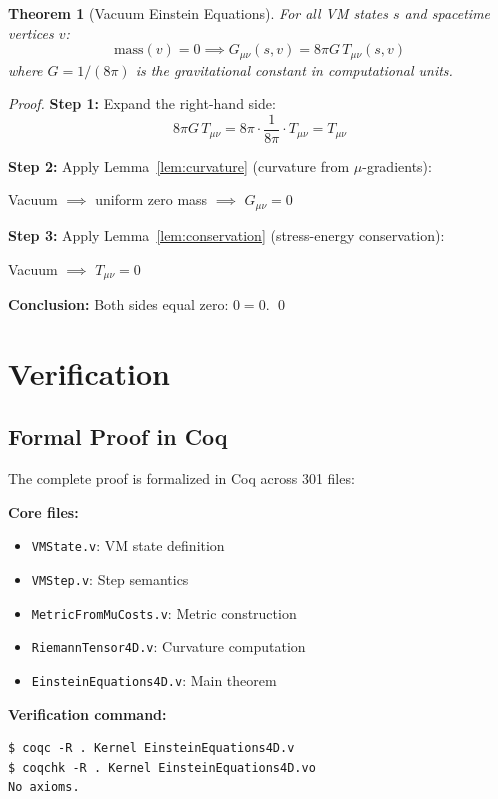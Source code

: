 \documentclass[11pt,twocolumn]{article}
\newtheorem{theorem}{Theorem}
\begin{document}
\begin{theorem}[Vacuum Einstein Equations]
For all VM states $s$ and spacetime vertices $v$:
\begin{equation}
\text{mass}(v) = 0 \implies G_{\mu\nu}(s,v) = 8\pi G \, T_{\mu\nu}(s,v)
\end{equation}
where $G = 1/(8\pi)$ is the gravitational constant in computational units.
\end{theorem}

\begin{proof}
\textbf{Step 1:} Expand the right-hand side:
\begin{equation}
8\pi G \, T_{\mu\nu} = 8\pi \cdot \frac{1}{8\pi} \cdot T_{\mu\nu} = T_{\mu\nu}
\end{equation}

\textbf{Step 2:} Apply Lemma~\ref{lem:curvature} (curvature from $\mu$-gradients):

Vacuum $\implies$ uniform zero mass $\implies$ $G_{\mu\nu} = 0$

\textbf{Step 3:} Apply Lemma~\ref{lem:conservation} (stress-energy conservation):

Vacuum $\implies$ $T_{\mu\nu} = 0$

\textbf{Conclusion:} Both sides equal zero: $0 = 0$. \qed
\end{proof}

\section{Verification}

\subsection{Formal Proof in Coq}

The complete proof is formalized in Coq across 301 files:

\textbf{Core files:}
\begin{itemize}
\item \texttt{VMState.v}: VM state definition
\item \texttt{VMStep.v}: Step semantics
\item \texttt{MetricFromMuCosts.v}: Metric construction
\item \texttt{RiemannTensor4D.v}: Curvature computation
\item \texttt{EinsteinEquations4D.v}: Main theorem
\end{itemize}

\textbf{Verification command:}
\begin{verbatim}
$ coqc -R . Kernel EinsteinEquations4D.v
$ coqchk -R . Kernel EinsteinEquations4D.vo
No axioms.
\end{verbatim}
\end{document}
